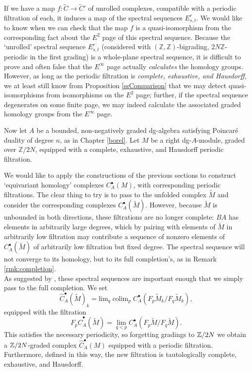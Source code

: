 \documentclass{memo-l}
\DeclareMathOperator{\colim}{colim}
\theoremstyle{definition}
\theoremstyle{remark}
\numberwithin{section}{chapter}
\numberwithin{equation}{chapter}
\begin{document}
If we have a map $f: \widetilde C \to \widetilde C'$ of unrolled complexes, compatible with a periodic filtration of each, it induces a map of the spectral sequences $E^r_{s,t}$. We would like to know when we can check that the map $f$ is a quasi-isomorphism from the corresponding fact about the $E^2$ page of this spectral sequence. Because the `unrolled' spectral sequence $E^r_{s,t}$ (considered with $(\mathbb Z, \mathbb Z)$-bigrading, $2N\mathbb Z$-periodic in the first grading) is a whole-plane spectral sequence, it is difficult to prove and often false that the $E^\infty$ page actually \emph{calculates} the homology groups. However, as long as the periodic filtration is \emph{complete, exhaustive, and Hausdorff}, we at least still know from Proposition \ref{ssComparison} that we may detect quasi-isomorphisms from isomorphisms on the $E^2$ page; further, if the spectral sequence degenerates on some finite page, we may indeed calculate the associated graded homology groups from the $E^\infty$ page.

Now let $A$ be a bounded, non-negatively graded dg-algebra satisfying Poincar\'e duality of degree $n$, as in Chapter \ref{borel}. Let $M$ be a right dg-$A$-module, graded over $\mathbb Z/2N$, equipped with a complete, exhaustive, and Hausdorff periodic filtration. %

We would like to apply the constructions of the previous sections to construct `equivariant homology' complexes $C^\bullet_A(M)$, with corresponding periodic filtrations. The clear thing to try is to pass to the unfolded complex $\tilde M$ and consider the corresponding complexes $C^\bullet_A(\tilde M)$. However, because $\tilde M$ is unbounded in both directions, these filtrations are no longer complete: $BA$ has elements in arbitrarily large degrees, which by pairing with elements of $\tilde M$ in arbitrarily low filtration may contribute a sequence of nonzero elements of $C^\bullet_A(\tilde M)$ of arbitrarily low filtration but fixed degree. The spectral sequence will not converge to its homology, but to its full completion's, as in Remark \ref{rmk:completion}.\\

As suggested by \cite[Definition 5.35]{GOH}, these spectral sequences are important enough that we simply pass to the full completion. We set $$\hat C^\bullet_A(\tilde M)_k = \text{lim}_q \colim_p C^\bullet_A(F_p \tilde M_k/F_q \tilde M_k),$$ equipped with the filtration $$F_p \hat C^\bullet_A(\tilde M) = \lim_{q < p} C^\bullet_A(F_p \tilde M/F_q \tilde M).$$ This satisfies the necessary periodicity, so forgetting gradings to $\Bbb Z/2N$ we obtain a $\Bbb Z/2N$-graded complex $\hat C^\bullet_A(M)$ equipped with a periodic filtration. Furthermore, defined in this way, the new filtration is tautologically complete, exhaustive, and Hausdorff. 
\end{document}
